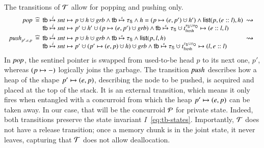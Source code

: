 The transitions of $\mathcal{T}$ allow for popping and pushing only. 
%
\[ 
{ 
\small
\hspace{-3pt}
  \begin{array}{r@{\ }c@{\ }l@{\ \ }c}
    \taupop & \eqdef &\htb \jpts \sent \hpts p \hunion h \hunion
    \garb \aand \htb \spts \histS  \aand h = (p \hpts (e, p')\hunion h') \aand \llist(p, (e::l), h) &
    \rightsquigarrow 
    \\
    & &\htb \jpts \sent \hpts p' \hunion h' \hunion (p \hpts (e,
    p') \hunion \garb) \aand \htb \spts \histS \hunion \tfr{\histS \hunion \histO} \hpts
    (e::l, l) 
    \\[3pt]
    \alphapush_{p', e, p} & \eqdef &\htb \jpts \sent \hpts p \hunion h \hunion
    \garb \aand \htb \spts \histS \aand \llist(p, l, h) &  \rightsquigarrow 
    \\
    & & \htb \jpts \sent \hpts p' \hunion (p' \hpts (e, p) \hunion h) \hunion
    \garb \aand \htb \spts \histS \hunion \tfr{\histS \hunion \histO} \hpts
    (l, e::l) 
    \end{array}
}\]
%
In ${\mathit{pop}}$, the sentinel pointer is swapped from used-to-be head $p$
to its next one, $p'$, whereas $(p \mapsto -)$ logically joins the
garbage. The transition ${\mathit{push}}$ describes how a heap of the shape
$p' \mapsto (e, p)$, describing the node to be pushed, is acquired and
placed at the top of the stack. It is an external transition, which
means it only fires when entangled with a concurroid from which the
heap $p' \mapsto (e, p)$ can be taken away. In our case, that will be
the concurroid $\mathcal{P}$ for private state. 
%
Indeed, both transitions preserve the state invariant
$I$~\eqref{eq:tb-states}.
%
Importantly, $\mathcal{T}$ does not have a release transition; once a memory
chunk is in the joint state, it never leaves, capturing that $\mathcal{T}$
does not allow deallocation.
%


